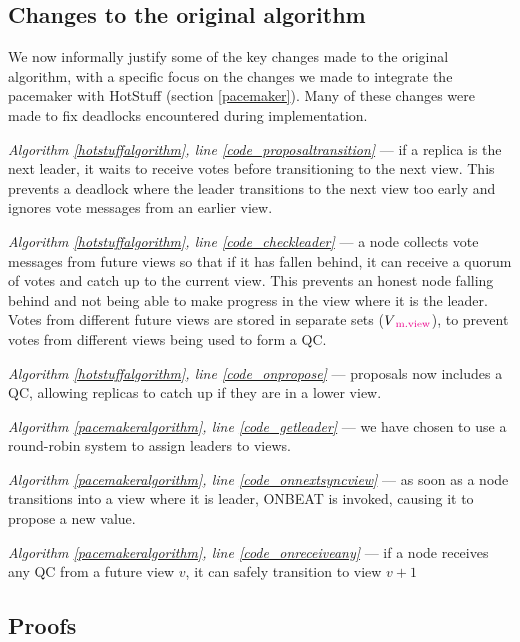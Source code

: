 \subsection{Changes to the original algorithm}
We now informally justify some of the key changes made to the original algorithm, with a specific focus on the changes we made to integrate the pacemaker with HotStuff (section \ref{pacemaker}). Many of these changes were made to fix deadlocks encountered during implementation.

\begin{description}
	\item \textit{Algorithm \ref{hotstuffalgorithm}, line \ref{code_proposaltransition}} --- if a replica is the next leader, it waits to receive votes before transitioning to the next view. This prevents a deadlock where the leader transitions to the next view too early and ignores vote messages from an earlier view.
	\item \textit{Algorithm \ref{hotstuffalgorithm}, line \ref{code_checkleader}} --- a node collects vote messages from future views so that if it has fallen behind, it can receive a quorum of votes and catch up to the current view. This prevents an honest node falling behind and not being able to make progress in the view where it is the leader. Votes from different future views are stored in separate sets ($V\textcolor{Magenta}{\textsubscript{m.view}}$), to prevent votes from different views being used to form a QC.
	\item \textit{Algorithm \ref{hotstuffalgorithm}, line \ref{code_onpropose}} --- proposals now includes a QC, allowing replicas to catch up if they are in a lower view.
	\item \textit{Algorithm \ref{pacemakeralgorithm}, line \ref{code_getleader}} --- we have chosen to use a round-robin system to assign leaders to views.
	\item \textit{Algorithm \ref{pacemakeralgorithm}, line \ref{code_onnextsyncview}} --- as soon as a node transitions into a view where it is leader, ON{\large B}EAT is invoked, causing it to propose a new value.
	\item \textit{Algorithm \ref{pacemakeralgorithm}, line \ref{code_onreceiveany}} --- if a node receives any QC from a future view $v$, it can safely transition to view $v + 1$
\end{description}

\subsection{Proofs} \label{proof}

